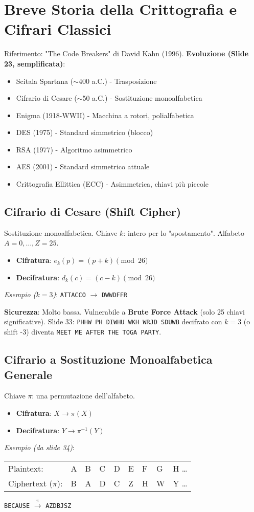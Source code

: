 \section{Breve Storia della Crittografia e Cifrari Classici}
Riferimento: "The Code Breakers" di David Kahn (1996).
\textbf{Evoluzione (Slide 23, semplificata)}:
\begin{itemize}
    \item Scitala Spartana ($\sim$400 a.C.) - Trasposizione
    \item Cifrario di Cesare ($\sim$50 a.C.) - Sostituzione monoalfabetica
    \item Enigma (1918-WWII) - Macchina a rotori, polialfabetica
    \item DES (1975) - Standard simmetrico (blocco)
    \item RSA (1977) - Algoritmo asimmetrico
    \item AES (2001) - Standard simmetrico attuale
    \item Crittografia Ellittica (ECC) - Asimmetrica, chiavi più piccole
\end{itemize}

\subsection{Cifrario di Cesare (Shift Cipher)}
Sostituzione monoalfabetica. Chiave $k$: intero per lo "spostamento". Alfabeto $A=0, \dots, Z=25$.
\begin{itemize}
    \item \textbf{Cifratura}: $e_k(p) = (p + k) \pmod{26}$
    \item \textbf{Decifratura}: $d_k(c) = (c - k) \pmod{26}$
\end{itemize}
\textit{Esempio ($k=3$)}: \texttt{ATTACCO} $\rightarrow$ \texttt{DWWDFFR}

\textbf{Sicurezza}: Molto bassa. Vulnerabile a \textbf{Brute Force Attack} (solo 25 chiavi significative).
Slide 33: \texttt{PHHW PH DIWHU WKH WRJD SDUWB} decifrato con $k=3$ (o shift -3) diventa \texttt{MEET ME AFTER THE TOGA PARTY}.

\subsection{Cifrario a Sostituzione Monoalfabetica Generale}
Chiave $\pi$: una permutazione dell'alfabeto.
\begin{itemize}
    \item \textbf{Cifratura}: $X \rightarrow \pi(X)$
    \item \textbf{Decifratura}: $Y \rightarrow \pi^{-1}(Y)$
\end{itemize}
\textit{Esempio (da slide 34)}:
\begin{tabular}{l l l l l l l l l}
    Plaintext: & A & B & C & D & E & F & G & H \dots \\
    Ciphertext ($\pi$): & B & A & D & C & Z & H & W & Y \dots
\end{tabular}
\texttt{BECAUSE} $\xrightarrow{\pi}$ \texttt{AZDBJSZ}

